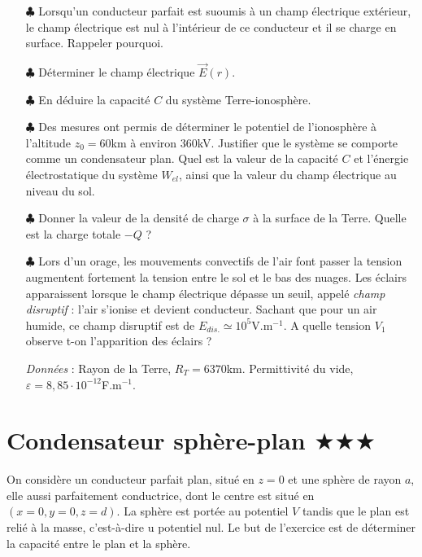 \documentclass{report}
\begin{document}
\begin{itemize}

	\item[$\clubsuit$] Lorsqu'un conducteur parfait est suoumis à un champ électrique extérieur, le champ électrique est nul à l'intérieur de ce conducteur et il se charge en surface. Rappeler pourquoi.
	
	\item[$\clubsuit$] Déterminer le champ électrique $\vec{E}(r)$.
		
	\item[$\clubsuit$] En déduire la capacité $C$ du système Terre-ionosphère.
	
	\item[$\clubsuit$] Des mesures ont permis de déterminer le potentiel de l'ionosphère à l'altitude $z_0=60$km à environ 360kV. Justifier que le système se comporte comme un condensateur plan. Quel est la valeur de la capacité $C$ et l'énergie électrostatique du système $W_{el}$, ainsi que la valeur du champ électrique au niveau du sol.
	
	\item[$\clubsuit$] Donner la valeur de la densité de charge $\sigma$ à la surface de la Terre. Quelle est la charge totale $-Q$ ?
	
	\item[$\clubsuit$] Lors d'un orage, les mouvements convectifs de l'air font passer la tension augmentent fortement la tension entre le sol et le bas des nuages. Les éclairs apparaissent lorsque le champ électrique dépasse un seuil, appelé \textit{champ disruptif} : l'air s'ionise et devient conducteur. Sachant que pour un air humide, ce champ disruptif est de $E_{dis.}\simeq10^{5}$V.m$^{-1}$. A quelle tension $V_1$ observe t-on l'apparition des éclairs ?
	
	
	\textit{Données} : Rayon de la Terre, $R_T=6370$km. Permittivité du vide, $\varepsilon=8,85\cdot10^{-12}$F.m$^{-1}$.
	
\end{itemize}

\newpage

\section*{Condensateur sphère-plan $\bigstar\bigstar\bigstar$}

On considère un conducteur parfait plan, situé en $z=0$ et une sphère de rayon $a$, elle aussi parfaitement conductrice, dont le centre est situé en $(x=0, y=0, z=d)$. La sphère est portée au potentiel $V$ tandis que le plan est relié à la masse, c'est-à-dire u potentiel nul. Le but de l'exercice est de déterminer la capacité entre le plan et la sphère.
\end{document}
